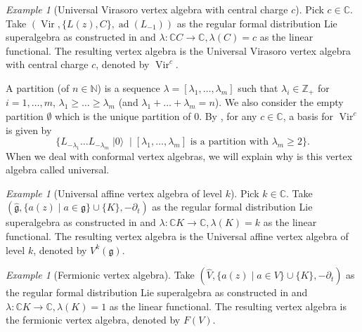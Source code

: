 \documentclass[a4paper, 12pt, reqno]{amsart}
\theoremstyle{remark}
\newtheorem{example}[theorem]{Example}
\numberwithin{equation}{subsection}
\DeclareMathOperator{\Vir}{Vir}
\DeclareMathOperator{\vac}{|0\rangle}
\DeclareMathOperator{\ad}{ad}
\begin{document}
\begin{example}[Universal Virasoro vertex algebra with central charge $c$]
  \label{exa:5}
  Pick $c \in \mathbb{C}$.
  Take $(\Vir, \{L(z), C\}, \ad(L_{-1}))$ as the regular formal distribution Lie superalgebra as constructed in  and $\lambda: \mathbb{C}C \to \mathbb{C}, \lambda(C) = c$ as the linear functional.
  The resulting vertex algebra is the Universal Virasoro vertex algebra with central charge $c$, denoted by $\Vir^c$.

  A partition (of $n \in \mathbb{N}$) is a sequence $\lambda = [\lambda_1, \dots, \lambda_m]$ such that $\lambda_i \in \mathbb{Z}_+$ for $i = 1, \dots, m$, $\lambda_1 \ge \dots \ge \lambda_m$ (and $\lambda_1 + \dots + \lambda_m = n$).
  We also consider the empty partition $\emptyset$ which is the unique partition of $0$.
  By , for any $c \in \mathbb{C}$, a basis for $\Vir^c$ is given by
  \begin{equation*}
    \{L_{-\lambda_1}\dots L_{-\lambda_m}\vac \mid [\lambda_1, \dots, \lambda_m]\text{ is a partition with } \lambda_m \ge 2\}.
  \end{equation*}
  When we deal with conformal vertex algebras, we will explain why is this vertex algebra called universal.
\end{example}

\begin{example}[Universal affine vertex algebra of level $k$]
  \label{exa:6}
  Pick $k \in \mathbb{C}$.
  Take $(\hat{\mathfrak{g}}, \{a(z) \mid a \in \mathfrak{g}\} \cup \{K\}, -\partial_t)$ as the regular formal distribution Lie superalgebra as constructed in  and $\lambda: \mathbb{C}K \to \mathbb{C}, \lambda(K) = k$ as the linear functional.
  The resulting vertex algebra is the Universal affine vertex algebra of level $k$, denoted by $V^k(\mathfrak{g})$.
\end{example}

\begin{example}[Fermionic vertex algebra]
  \label{exa:7}
  Take $(\widehat{V}, \{a(z) \mid a \in V\} \cup \{K\}, -\partial_t)$ as the regular formal distribution Lie superalgebra as constructed in  and $\lambda: \mathbb{C}K \to \mathbb{C}, \lambda(K) = 1$ as the linear functional.
  The resulting vertex algebra is the fermionic vertex algebra, denoted by $F(V)$.
\end{example}
\end{document}

